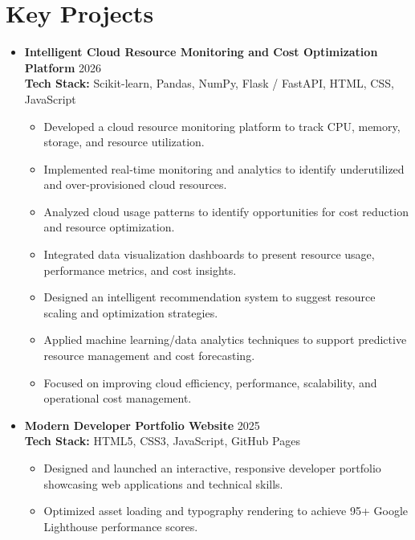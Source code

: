 \documentclass[a4paper,9.5pt]{article}
\begin{document}
\section{Key Projects}
\begin{itemize}[leftmargin=0.1in, label={}, itemsep=1pt, topsep=1pt]
    \item
    \textbf{\footnotesize Intelligent Cloud Resource Monitoring and Cost Optimization Platform} \hfill \footnotesize 2026 \\
    \footnotesize{\textbf{Tech Stack:} Scikit-learn, Pandas, NumPy, Flask / FastAPI, HTML, CSS, JavaScript}
    \begin{itemize}[leftmargin=0.15in, itemsep=-2.5pt, topsep=0pt]
        \footnotesize \item Developed a cloud resource monitoring platform to track CPU, memory, storage, and resource utilization.
        \footnotesize \item Implemented real-time monitoring and analytics to identify underutilized and over-provisioned cloud resources.
        \footnotesize \item Analyzed cloud usage patterns to identify opportunities for cost reduction and resource optimization.
        \footnotesize \item Integrated data visualization dashboards to present resource usage, performance metrics, and cost insights.
        \footnotesize \item Designed an intelligent recommendation system to suggest resource scaling and optimization strategies.
        \footnotesize \item Applied machine learning/data analytics techniques to support predictive resource management and cost forecasting.
        \footnotesize \item Focused on improving cloud efficiency, performance, scalability, and operational cost management.
    \end{itemize}

    \item
    \textbf{\footnotesize Modern Developer Portfolio Website} \hfill \footnotesize 2025 \\
    \footnotesize{\textbf{Tech Stack:} HTML5, CSS3, JavaScript, GitHub Pages}
    \begin{itemize}[leftmargin=0.15in, itemsep=-2pt, topsep=0pt]
        \footnotesize \item Designed and launched an interactive, responsive developer portfolio showcasing web applications and technical skills.
        \footnotesize \item Optimized asset loading and typography rendering to achieve 95+ Google Lighthouse performance scores.
    \end{itemize}
\end{itemize}
\end{document}
